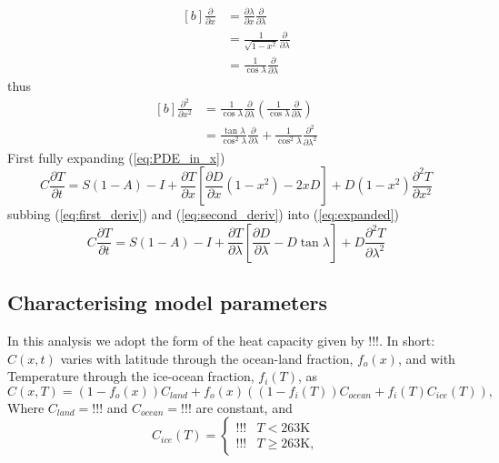 \documentclass[12pt, onecolumn]{revtex4-2}    %
\begin{document}
\begin{equation}
    \begin{aligned}[b]
        \frac{\partial}{\partial x} & = \frac{\partial \lambda}{\partial x} \frac {\partial} {\partial \lambda} \\
                                    & = \frac{1}{\sqrt{1-x^2}} \frac {\partial} {\partial \lambda}              \\
                                    & = \frac{1}{\cos \lambda} \frac {\partial} {\partial \lambda}
    \end{aligned}
    \label{eq:first_deriv}
\end{equation}
thus
\begin{equation}
    \begin{aligned}[b]
        \frac{\partial^2}{\partial x^2} & = \frac{1}{\cos\lambda} \frac{\partial}{\partial \lambda} \left( \frac{1}{\cos\lambda} \frac{\partial}{\partial \lambda} \right)     \\
                                        & = \frac{\tan\lambda}{\cos^2\lambda}\frac{\partial}{\partial \lambda} + \frac{1}{\cos^2\lambda} \frac{\partial^2}{\partial \lambda^2}
    \end{aligned}
    \label{eq:second_deriv}
\end{equation}
First fully expanding (\ref{eq:PDE_in_x})
\begin{equation}
    C \frac{\partial T}{\partial t} = S(1-A) - I
    + \frac{\partial T}{\partial x}\left[\frac{\partial D}{\partial x}(1-x^2) - 2 x D\right]
    + D (1-x^2) \frac{\partial^2 T}{\partial x^2}
    \label{eq:expanded}
\end{equation}
subbing (\ref{eq:first_deriv}) and (\ref{eq:second_deriv}) into (\ref{eq:expanded})
\begin{equation}
    C \frac{\partial T}{\partial t} = S(1-A) - I
    + \frac{\partial T}{\partial \lambda}\left[\frac{\partial D}{\partial \lambda} - D \tan\lambda\right]
    + D \frac{\partial^2 T}{\partial \lambda^2}
    \label{eq:PDE_in_lat}
\end{equation}

\subsection{Characterising model parameters} \label{sec:model_params}

In this analysis we adopt the form of the heat capacity given by !!!.
In short: $C(x, t)$ varies with latitude through the ocean-land fraction, $f_o(x)$, and with Temperature through the ice-ocean fraction, $f_i(T)$, as
$$
    C(x, T) = (1 - f_o(x)) C_{land} + f_o(x) ((1-f_i(T)) C_{ocean} + f_i(T) C_{ice}(T)),
$$
Where $C_{land} = !!!$ and $C_{ocean} = !!!$ are constant, and
$$
    C_{ice}(T) =
    \begin{cases}
        !!! & T < 263\text{K}    \\
        !!! & T \ge 263\text{K},
    \end{cases}
$$
\end{document}
